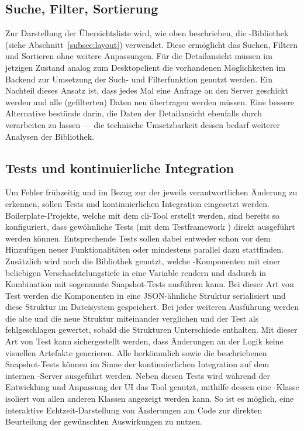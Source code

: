 \subsection{Suche, Filter, Sortierung}
Zur Darstellung der Übersichtsliste wird, wie oben beschrieben, die -Bibliothek  (siehe Abschnitt~\ref{subsec:layout}) verwendet. Diese ermöglicht das Suchen, Filtern und Sortieren ohne weitere Anpassungen. Für die Detailansicht müssen im jetzigen Zustand analog zum Desktopclient die vorhandenen Möglichkeiten im Backend zur Umsetzung der Such- und Filterfunktion genutzt werden. Ein Nachteil dieses Ansatz ist, dass jedes Mal eine Anfrage an den Server geschickt werden und alle (gefilterten) Daten neu übertragen werden müssen. Eine bessere Alternative bestünde darin, die Daten der Detailansicht ebenfalls durch  verarbeiten zu lassen --- die technische Umsetzbarkeit dessen bedarf weiterer Analysen der Bibliothek.

\subsection{Tests und kontinuierliche Integration}\label{subsec:test_ci_concept}
Um Fehler frühzeitig und im Bezug zur der jeweils verantwortlichen Änderung zu erkennen, sollen Tests und kontinuierlichen Integration eingesetzt werden. Boilerplate-Projekte, welche mit dem \gls{cli}-Tool  erstellt werden, sind bereits so konfiguriert, dass gewöhnliche Tests (mit dem Testframework ) direkt ausgeführt werden können. Entsprechende Tests sollen dabei entweder schon vor dem Hinzufügen neuer Funktionalitäten oder mindestens parallel dazu stattfinden. Zusätzlich wird noch die Bibliothek  genutzt, welche -Komponenten mit einer beliebigen Verschachtelungstiefe in eine Variable rendern und dadurch in Kombination mit  sogenannte Snapshot-Tests ausführen kann. Bei dieser Art von Test werden die Komponenten in eine JSON-ähnliche Struktur serialisiert und diese Struktur im Dateisystem gespeichert. Bei jeder weiteren Ausführung werden die alte und die neue Struktur miteinander verglichen und der Test als fehlgeschlagen gewertet, sobald die Strukturen Unterschiede enthalten. Mit dieser Art von Test kann sichergestellt werden, dass Änderungen an der Logik keine visuellen Artefakte generieren. Alle herkömmlich sowie die beschriebenen Snapshot-Tests können im Sinne der kontinuierlichen Integration auf dem internen -Server ausgeführt werden.
Neben diesen Tests wird während der Entwicklung und Anpassung der UI das Tool  genutzt, mithilfe dessen eine -Klasse isoliert von allen anderen Klassen angezeigt werden kann. So ist es möglich, eine interaktive Echtzeit-Darstellung von Änderungen am Code zur direkten Beurteilung der gewünschten Auswirkungen zu nutzen.

